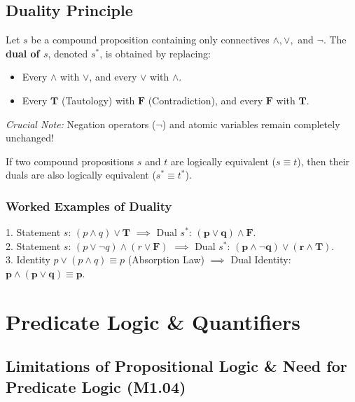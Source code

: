 \documentclass[11pt,a4paper]{article}
\begin{document}
\subsection{Duality Principle}

\begin{definition}
Let $s$ be a compound proposition containing only connectives $\land, \lor,$ and $\neg$. The \textbf{dual of $s$}, denoted $s^*$, is obtained by replacing:
\begin{itemize}[leftmargin=1.5em]
    \item Every $\land$ with $\lor$, and every $\lor$ with $\land$.
    \item Every $\mathbf{T}$ (Tautology) with $\mathbf{F}$ (Contradiction), and every $\mathbf{F}$ with $\mathbf{T}$.
\end{itemize}
\textit{Crucial Note:} Negation operators ($\neg$) and atomic variables remain completely unchanged!
\end{definition}

\begin{theorem}
If two compound propositions $s$ and $t$ are logically equivalent ($s \equiv t$), then their duals are also logically equivalent ($s^* \equiv t^*$).
\end{theorem}

\subsubsection*{Worked Examples of Duality}
1. Statement $s$: $(p \land q) \lor \mathbf{T}$ $\implies$ Dual $s^*$: $\mathbf{(p \lor q) \land \mathbf{F}}$. \\
2. Statement $s$: $(p \lor \neg q) \land (r \lor \mathbf{F})$ $\implies$ Dual $s^*$: $\mathbf{(p \land \neg q) \lor (r \land \mathbf{T})}$. \\
3. Identity $p \lor (p \land q) \equiv p$ (Absorption Law) $\implies$ Dual Identity: $\mathbf{p \land (p \lor q) \equiv p}$.

\section{Predicate Logic \& Quantifiers}

\subsection{Limitations of Propositional Logic \& Need for Predicate Logic (M1.04)}
\end{document}
